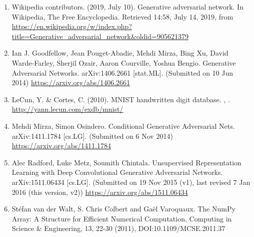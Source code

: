 \documentclass[a4paper, 12pt]{article}
\begin{document}
\begin{enumerate}
\item Wikipedia contributors. (2019, July 10). Generative adversarial network. In Wikipedia, The Free Encyclopedia. Retrieved 14:58, July 14, 2019, from \url{https://en.wikipedia.org/w/index.php?title=Generative_adversarial_network&oldid=905621379}

\item Ian J. Goodfellow, Jean Pouget-Abadie, Mehdi Mirza, Bing Xu, David Warde-Farley, Sherjil Ozair, Aaron Courville, Yoshua Bengio. Generative Adversarial Networks. arXiv:1406.2661 [stat.ML]. (Submitted on 10 Jun 2014) \url{https://arxiv.org/abs/1406.2661}

\item LeCun, Y. \& Cortes, C. (2010). MNIST handwritten digit database. , .  \url{http://yann.lecun.com/exdb/mnist/}

\item Mehdi Mirza, Simon Osindero. Conditional Generative Adversarial Nets. arXiv:1411.1784 [cs.LG]. (Submitted on 6 Nov 2014) \url{https://arxiv.org/abs/1411.1784}

\item Alec Radford, Luke Metz, Soumith Chintala. Unsupervised Representation Learning with Deep Convolutional Generative Adversarial Networks. arXiv:1511.06434 [cs.LG]. (Submitted on 19 Nov 2015 (v1), last revised 7 Jan 2016 (this version, v2)) \url{https://arxiv.org/abs/1511.06434}

\item Stéfan van der Walt, S. Chris Colbert and Gaël Varoquaux. The NumPy Array: A Structure for Efficient Numerical Computation, Computing in Science \& Engineering, 13, 22-30 (2011), DOI:10.1109/MCSE.2011.37

\end{enumerate}
\end{document}
